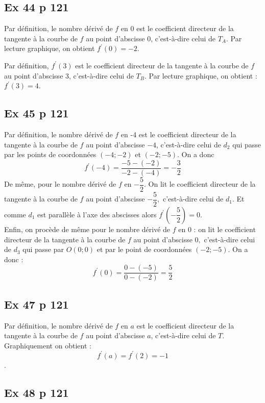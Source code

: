 \documentclass[12pt,a5paper]{book}
\begin{document}
\subsection*{Ex 44 p 121}
\begin{enumMet}
    \item Par définition, le nombre dérivé de $f$ en 0 est le coefficient directeur de la tangente à la courbe de $f$ au point d'abscisse 0, c'est-à-dire celui de $T_{A}$. Par lecture graphique, on obtient $f^{\prime}(0)=-2$.
    \item Par définition, $f^{\prime}(3)$ est le coefficient directeur de la tangente à la courbe de $f$ au point d'abscisse 3, c'est-à-dire celui de $T_{B}$. Par lecture graphique, on obtient : $f^{\prime}(3)=4$.
\end{enumMet}

\subsection*{Ex 45 p 121}

Par définition, le nombre dérivé de $f$ en -4 est le coefficient directeur de la tangente à la courbe de $f$ au point d'abscisse $-4$, c'est-à-dire celui de $d_{2}$ qui passe par les points de coordonnées $(-4 ;-2)$ et
$(-2 ;-5)$. On a donc
$$
f^{\prime}(-4)=\dfrac{-5-(-2)}{-2-(-4)}=-\dfrac{3}{2}
$$
De même, pour le nombre dérivé de $f$ en $-\dfrac{5}{2}$. On lit le coefficient directeur de la tangente à la courbe de $f$ au point d'abscisse $-\dfrac{5}{2},$ c'est-à-dire celui de $d_{1}$. Et comme $d_{1}$ est parallèle à l'axe des abscisses
alors $f^{\prime}\left(-\dfrac{5}{2}\right)=0$.\\
Enfin, on procède de même pour le nombre dérivé de $f$ en 0 : on lit le coefficient directeur de la tangente à la courbe de $f$ au point d'abscisse $0,$ c'est-à-dire celui de $d_{3}$ qui passe par $O(0 ; 0)$ et par
le point de coordonnées $(-2 ;-5)$. On a donc :
$$f^{\prime}(0)=\dfrac{0-(-5)}{0-(-2)}=\dfrac{5}{2}$$

\subsection*{Ex 47 p 121}

Par définition, le nombre dérivé de $f$ en $a$ est le coefficient directeur de la tangente à la courbe de $f$ au point d'abscisse $a$, c'est-à-dire celui de $T$. Graphiquement on obtient : $$f^{\prime}(a)=f^{\prime}(2)=-1$$.

\subsection*{Ex 48 p 121}
\end{document}
